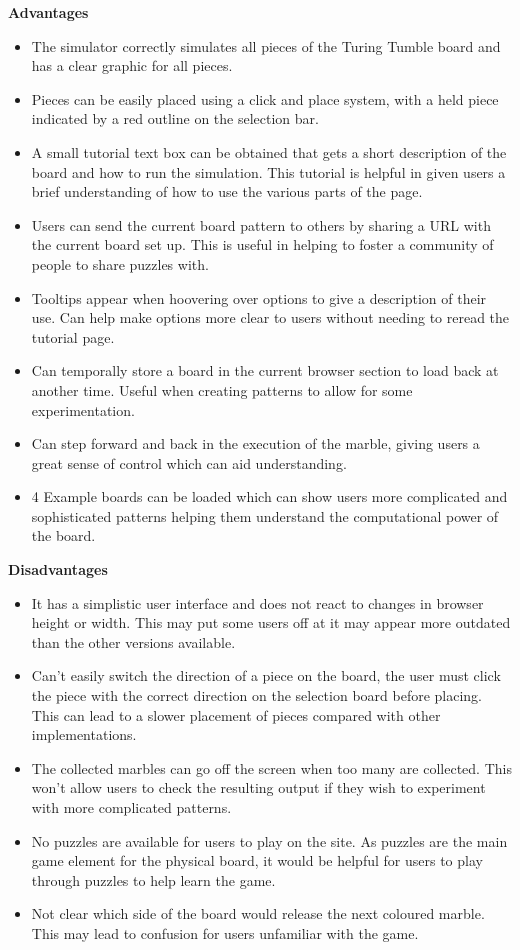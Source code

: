 \documentclass{l4proj}
\begin{document}
\textbf{Advantages}
\begin{itemize}
    \item The simulator correctly simulates all pieces of the Turing Tumble board and has a clear graphic for all pieces.
    \item Pieces can be easily placed using a click and place system, with a held piece indicated by a red outline on the selection bar.
    \item A small tutorial text box can be obtained that gets a short description of the board and how to run the simulation. This tutorial is helpful in given users a brief understanding of how to use the various parts of the page.
    \item Users can send the current board pattern to others by sharing a URL with the current board set up. This is useful in helping to foster a community of people to share puzzles with.
    \item Tooltips appear when hoovering over options to give a description of their use. Can help make options more clear to users without needing to reread the tutorial page.
    \item Can temporally store a board in the current browser section to load back at another time. Useful when creating patterns to allow for some experimentation.
    \item Can step forward and back in the execution of the marble, giving users a great sense of control which can aid understanding.
    \item 4 Example boards can be loaded which can show users more complicated and sophisticated patterns helping them understand the computational power of the board.
\end{itemize}

\textbf{Disadvantages}
\begin{itemize}
    \item It has a simplistic user interface and does not react to changes in browser height or width. This may put some users off at it may appear more outdated than the other versions available.
    \item Can't easily switch the direction of a piece on the board, the user must click the piece with the correct direction on the selection board before placing. This can lead to a slower placement of pieces compared with other implementations.
    \item The collected marbles can go off the screen when too many are collected. This won't allow users to check the resulting output if they wish to experiment with more complicated patterns.
    \item No puzzles are available for users to play on the site. As puzzles are the main game element for the physical board, it would be helpful for users to play through puzzles to help learn the game.
    \item Not clear which side of the board would release the next coloured marble. This may lead to confusion for users unfamiliar with the game.
\end{itemize}
\end{document}
